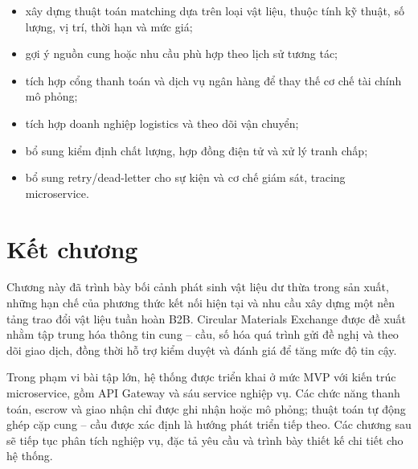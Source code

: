 \documentclass[12pt,a4paper,oneside]{report}
\begin{document}
\begin{itemize}[leftmargin=1.1cm]
  \item xây dựng thuật toán matching dựa trên loại vật liệu, thuộc tính kỹ thuật,
  số lượng, vị trí, thời hạn và mức giá;
  \item gợi ý nguồn cung hoặc nhu cầu phù hợp theo lịch sử tương tác;
  \item tích hợp cổng thanh toán và dịch vụ ngân hàng để thay thế cơ chế tài
  chính mô phỏng;
  \item tích hợp doanh nghiệp logistics và theo dõi vận chuyển;
  \item bổ sung kiểm định chất lượng, hợp đồng điện tử và xử lý tranh chấp;
  \item bổ sung retry/dead-letter cho sự kiện và cơ chế giám sát, tracing
  microservice.
\end{itemize}

\section{Kết chương}
\label{sec:ket-chuong-1}

Chương này đã trình bày bối cảnh phát sinh vật liệu dư thừa trong sản xuất, những
hạn chế của phương thức kết nối hiện tại và nhu cầu xây dựng một nền tảng trao
đổi vật liệu tuần hoàn B2B. Circular Materials Exchange được đề xuất nhằm tập
trung hóa thông tin cung -- cầu, số hóa quá trình gửi đề nghị và theo dõi giao
dịch, đồng thời hỗ trợ kiểm duyệt và đánh giá để tăng mức độ tin cậy.

Trong phạm vi bài tập lớn, hệ thống được triển khai ở mức MVP với kiến trúc
microservice, gồm API Gateway và sáu service nghiệp vụ. Các chức năng thanh toán,
escrow và giao nhận chỉ được ghi nhận hoặc mô phỏng; thuật toán tự động ghép cặp
cung -- cầu được xác định là hướng phát triển tiếp theo. Các chương sau sẽ tiếp
tục phân tích nghiệp vụ, đặc tả yêu cầu và trình bày thiết kế chi tiết cho hệ
thống.
\end{document}
